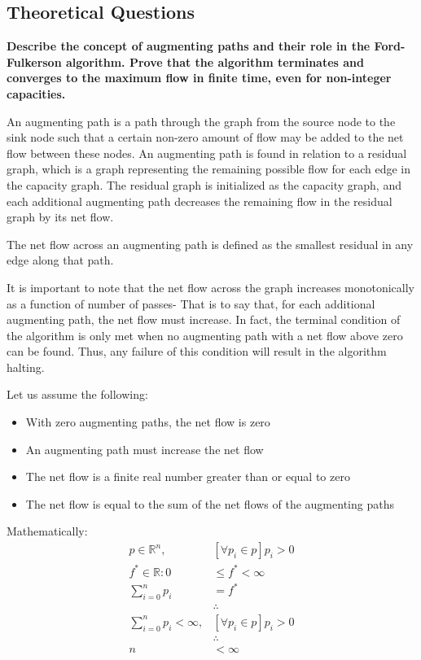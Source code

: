 \documentclass[12pt]{amsart}
\begin{document}
\subsection{Theoretical Questions}

    \textbf{Describe the concept of augmenting paths and
    their role in the Ford-Fulkerson algorithm. Prove that the
    algorithm terminates and converges to the maximum flow in
    finite time, even for non-integer capacities.}

    An augmenting path is a path through the graph from the
    source node to the sink node such that a certain non-zero
    amount of flow may be added to the net flow between these
    nodes. An augmenting path is found in relation to a residual
    graph, which is a graph representing the remaining possible
    flow for each edge in the capacity graph. The residual graph
    is initialized as the capacity graph, and each additional
    augmenting path decreases the remaining flow in the residual
    graph by its net flow.

    The net flow across an augmenting path is defined as the
    smallest residual in any edge along that path.

    It is important to note that the net flow across the graph
    increases monotonically as a function of number of passes-
    That is to say that, for each additional augmenting path,
    the net flow must increase. In fact, the terminal condition
    of the algorithm is only met when no augmenting path with a
    net flow above zero can be found. Thus, any failure of this
    condition will result in the algorithm halting.

    Let us assume the following:
    \begin{itemize}
        \item With zero augmenting paths, the net flow is zero
        \item An augmenting path must increase the net flow
        \item The net flow is a finite real number greater than
            or equal to zero
        \item The net flow is equal to the sum of the net flows
            of the augmenting paths
    \end{itemize}

    Mathematically:
    \[
    \begin{aligned}
        p \in \mathbb{R}^n , &\left[ \forall p_i \in p \right]
            p_i > 0 \\
        f^* \in \mathbb{R}: 0 &\le f^* < \infty \\
        \sum_{i = 0}^n { p_i } &= f^* \\
        &\therefore \\
        \sum_{i = 0}^n p_i < \infty , &\left[ \forall p_i \in p
            \right] p_i > 0 \\
        &\therefore \\
        n &< \infty \\
    \end{aligned}
    \]
\end{document}
